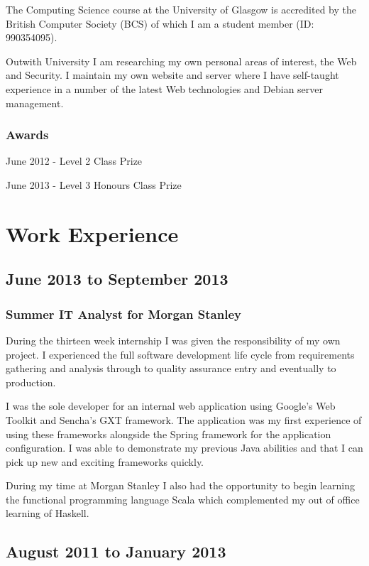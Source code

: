 \documentclass[11pt,a4paper]{article}
\begin{document}
The Computing Science course at the University of Glasgow is accredited by the
British Computer Society (BCS) of which I am a student member (ID: 990354095).

Outwith University I am researching my own personal areas of interest, the
Web and Security. I maintain my own website and server where I have self-taught
experience in a number of the latest Web technologies and Debian server
management.

\subsubsection*{Awards}

June 2012 - Level 2 Class Prize

June 2013 - Level 3 Honours Class Prize

\section*{Work Experience}

\subsection*{June 2013 to September 2013}

\subsubsection*{Summer IT Analyst for Morgan Stanley}

During the thirteen week internship I was given the responsibility of my own 
project. I experienced the full software development life cycle from 
requirements gathering and analysis through to quality assurance entry and 
eventually to production.

I was the sole developer for an internal web application using Google's Web
Toolkit and Sencha's GXT framework. The application was my first experience
of using these frameworks alongside the Spring framework for the application
configuration. I was able to demonstrate my previous Java abilities and that
I can pick up new and exciting frameworks quickly.

During my time at Morgan Stanley I also had the opportunity to begin learning
the functional programming language Scala which complemented my out of office
learning of Haskell.

\subsection*{August 2011 to January 2013}
\end{document}
